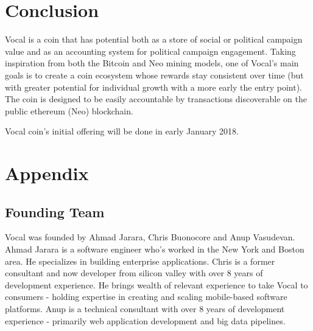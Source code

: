 \documentclass[conference]{IEEEtran}
\begin{document}
      
      
    
    \FloatBarrier
    \section{Conclusion}
   Vocal is a coin that has potential both as a store of social or political campaign value and as an accounting system for political campaign engagement. Taking inspiration from both the Bitcoin and Neo mining models, one of Vocal's main goals is to create a coin ecosystem whose rewards stay consistent over time (but with greater potential for individual growth with a more early the entry point). The coin is designed to be easily accountable by transactions discoverable on the public ethereum (Neo) blockchain.

   Vocal coin's initial offering will be done in early January 2018.

    
    \section*{Appendix}

    \subsection{Founding Team}
   Vocal was founded by Ahmad Jarara, Chris Buonocore and Anup Vasudevan. Ahmad Jarara is a software engineer who's worked in the New York and Boston area. He specializes
   in building enterprise applications. Chris is a former consultant and now developer from silicon valley with over 8 years of development experience. He brings wealth of relevant
   experience to take Vocal to consumers - holding expertise in creating and scaling mobile-based software platforms. Anup is a technical consultant with over 8
   years of development experience - primarily web application development and big data pipelines.
\end{document}

